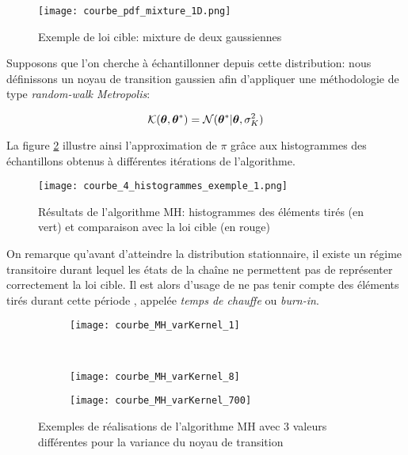 \begin{figure}[h!]
	\centering
	\texttt{[image: courbe\_pdf\_mixture\_1D.png]}
	\caption{Exemple de loi cible: mixture de deux gaussiennes}
	\label{fig_courbe_pdf_mixture_1D}
\end{figure}


 Supposons que l'on cherche à échantillonner depuis cette distribution: nous définissons un noyau de transition  gaussien afin d'appliquer une méthodologie de type \textit{random-walk Metropolis}: 

\begin{equation}
{\mathcal{K}}({\bm{\theta}}, {{\bm{\theta}}^*} ) = \mathcal{N}({{\bm{\theta}}^*} | {\bm{\theta}}, \sigma_{K}^2)
\label{eq_noyau_gaussien}
\end{equation}

La figure \ref{fig_courbe_4_histogrammes_exemple_1} illustre ainsi l'approximation de $\pi$ grâce aux histogrammes des {échantillons} obtenus à différentes itérations de l'algorithme. 

\begin{figure}[h!]
	\centering
	\texttt{[image: courbe\_4\_histogrammes\_exemple\_1.png]}
	\caption{Résultats de l'algorithme MH: histogrammes des éléments tirés (en vert) et comparaison avec la loi cible (en rouge)}
	\label{fig_courbe_4_histogrammes_exemple_1}
\end{figure}

On remarque qu'avant d'atteindre la distribution stationnaire, il existe un régime transitoire durant lequel les états de la chaîne ne permettent pas de représenter correctement la loi cible. Il est alors d'usage de ne pas tenir compte des éléments tirés durant cette période , appelée \textit{temps de chauffe} ou \textit{burn-in}. \\


\begin{figure}[h!]
	\centering
	\begin{subfigure}[t]{0.5\textwidth}
		\centering
		\texttt{[image: courbe\_MH\_varKernel\_1]}
		\caption{}
		\label{subfig_varK_1}
	\end{subfigure}%
	~ 
	\begin{subfigure}[t]{0.5\textwidth}
		\centering
		\texttt{[image: courbe\_MH\_varKernel\_8]}
		\caption{}
		\label{subfig_varK_8}
	\end{subfigure}
	\begin{subfigure}{0.5\textwidth}
		\centering
		\texttt{[image: courbe\_MH\_varKernel\_700]}
		\caption{}
		\label{subfig_varK_700}
	\end{subfigure}
	
	\caption{Exemples de réalisations de l'algorithme MH avec 3 valeurs différentes pour la variance du noyau de transition}
\end{figure}

